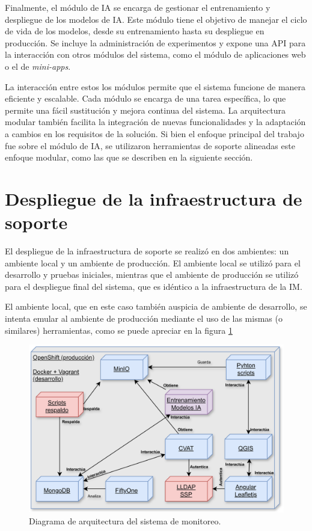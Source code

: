 Finalmente, el módulo de IA se encarga de gestionar el entrenamiento y despliegue de los modelos de IA. Este módulo tiene el objetivo de manejar el ciclo de vida de los modelos, desde su entrenamiento hasta su despliegue en producción. Se incluye la administración de experimentos y expone una API para la interacción con otros módulos del sistema, como el módulo de aplicaciones web o el de \textit{mini-apps}.

La interacción entre estos los módulos permite que el sistema funcione de manera eficiente y escalable. Cada módulo se encarga de una tarea específica, lo que permite una fácil sustitución y mejora continua del sistema. La arquitectura modular también facilita la integración de nuevas funcionalidades y la adaptación a cambios en los requisitos de la solución. Si bien el enfoque principal del trabajo fue sobre el módulo de IA, se utilizaron herramientas de soporte alineadas este enfoque modular, como las que se describen en la siguiente sección.


\section{Despliegue de la infraestructura de soporte}
\label{sec:despliegue_infraestructura}

El despliegue de la infraestructura de soporte se realizó en dos ambientes: un ambiente local y un ambiente de producción. El ambiente local se utilizó para el desarrollo y pruebas iniciales, mientras que el ambiente de producción se utilizó para el despliegue final del sistema, que es idéntico a la infraestructura de la IM.

El ambiente local, que en este caso también auspicia de ambiente de desarrollo, se intenta emular al ambiente de producción mediante el uso de las mismas (o similares) herramientas, como se puede apreciar en la figura \ref{fig:infra-desarrollo}

\begin{figure}[htpb]
  \centering
  \includegraphics[scale=0.09]{./Figures/herramientas-plataforma.png}
  \caption{Diagrama de arquitectura del sistema de monitoreo.}
  \label{fig:infra-desarrollo}
\end{figure}

